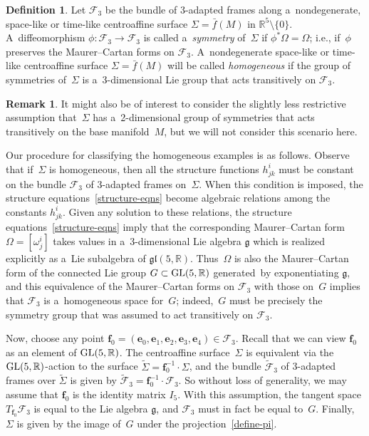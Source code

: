 \documentclass[pdftex]{sigma}
\numberwithin{equation}{section}
\theoremstyle{definition}
\newtheorem{dfn}[teo]{Definition}
\newtheorem{rmk}[teo]{Remark}
\begin{document}
\begin{dfn}
\label{homogeneous-def}
Let $\mathcal{F}_3$ be the bundle of 3-adapted frames along a~nondegenerate, space-like or time-like centroaf\/f\/ine surface
$\Sigma = \bar{f}(M)$ in $\mathbb{R}^5 \setminus \{0 \}$.
A~dif\/feomorphism $\phi:\mathcal{F}_3 \to \mathcal{F}_3$ is called a~{\em symmetry} of~$\Sigma$ if $\phi^*\Omega =
\Omega$; i.e., if~$\phi$ preserves the Maurer--Cartan forms on $\mathcal{F}_3$.
A~nondegenerate space-like or time-like centroaf\/f\/ine surface $\Sigma = \bar{f}(M)$ will be called {\em homogeneous} if the
group of symmetries of~$\Sigma$ is a~3-dimensional Lie group that acts transitively on $\mathcal{F}_3$.
\end{dfn}

\begin{rmk}
It might also be of interest to consider the slightly less restrictive assumption that~$\Sigma$ has a~2-dimensional
group of symmetries that acts transitively on the base manifold~$M$, but we will not consider this scenario here.
\end{rmk}

Our procedure for classifying the homogeneous examples is as follows.
Observe that if~$\Sigma$ is homogeneous, then all the structure functions $h^i_{jk}$ must be constant on the bundle
$\mathcal{F}_3$ of 3-adapted frames on~$\Sigma$.
When this condition is imposed, the structure equations~\eqref{structure-eqns} become algebraic relations among the
constants $h^i_{jk}$.
Given any solution to these relations, the structure equations~\eqref{structure-eqns} imply that the corresponding
Maurer--Cartan form $\Omega = [\omega^i_j]$ takes values in a~3-dimensional Lie algebra $\mathfrak{g}$ which is realized
explicitly as a~Lie subalgebra of $\mathfrak{gl}(5,\mathbb{R})$.
Thus~$\Omega$ is also the Maurer--Cartan form of the connected Lie group $G \subset {\rm GL}(5,\mathbb{R})$ generated~by
exponentiating $\mathfrak{g}$, and this equivalence of the Maurer--Cartan forms on $\mathcal{F}_3$ with those on~$G$
implies that $\mathcal{F}_3$ is a~homogeneous space for~$G$; indeed,~$G$ must be precisely the symmetry group that was
assumed to act transitively on $\mathcal{F}_3$.

Now, choose any point $\mathbf{f}_0 = (\mathbf{e}_0, \mathbf{e}_1, \mathbf{e}_2, \mathbf{e}_3, \mathbf{e}_4) \in
\mathcal{F}_3$.
Recall that we can view $\mathbf{f}_0$ as an element of ${\rm GL}(5,\mathbb{R})$.
The centroaf\/f\/ine surface~$\Sigma$ is equivalent via the ${\rm GL}(5,\mathbb{R})$-action to the surface
$\widetilde{\Sigma} = \mathbf{f}_0^{-1} \cdot \Sigma$, and the bundle $\widetilde{\mathcal{F}}_3$ of 3-adapted frames
over $\widetilde{\Sigma}$ is given by $\widetilde{\mathcal{F}}_3 = \mathbf{f}_0^{-1} \cdot \mathcal{F}_3$.
So without loss of generality, we may assume that $\mathbf{f}_0$ is the identity matrix $I_5$.
With this assumption, the tangent space $T_{\mathbf{f}_0}\mathcal{F}_3$ is equal to the Lie algebra $\mathfrak{g}$, and
$\mathcal{F}_3$ must in fact be equal to~$G$.
Finally,~$\Sigma$ is given by the image of~$G$ under the projection~\eqref{define-pi}.
\end{document}
